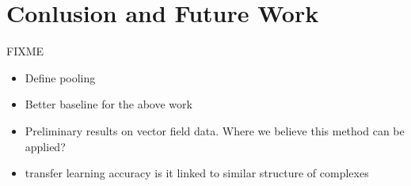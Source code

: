 \section{Conlusion and Future Work}

FIXME

\begin{itemize}
\item Define pooling
\item Better baseline for the above work
\item Preliminary results on vector field data. Where we believe this method can be applied?
\item transfer learning accuracy is it linked to similar structure of complexes
\end{itemize}